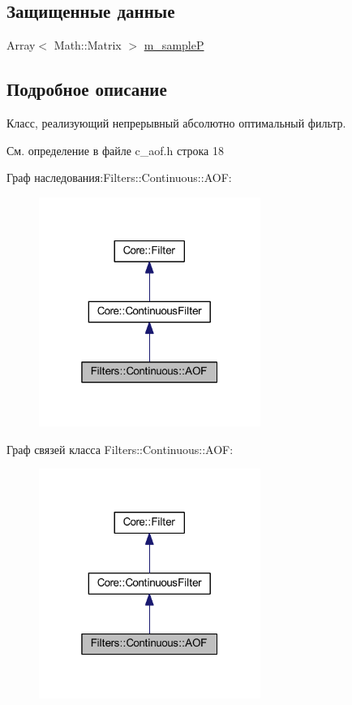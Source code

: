 \subsection*{Защищенные данные}
\begin{DoxyCompactItemize}
\item 
Array$<$ Math\+::\+Matrix $>$ \hyperlink{class_filters_1_1_continuous_1_1_a_o_f_a3cff90f7e12e677f04102f1717ef7a49}{m\+\_\+sampleP}
\end{DoxyCompactItemize}


\subsection{Подробное описание}
Класс, реализующий непрерывный абсолютно оптимальный фильтр. 

См. определение в файле c\+\_\+aof.\+h строка 18



Граф наследования\+:Filters\+:\+:Continuous\+:\+:A\+OF\+:
\nopagebreak
\begin{figure}[H]
\begin{center}
\leavevmode
\includegraphics[width=205pt]{class_filters_1_1_continuous_1_1_a_o_f__inherit__graph}
\end{center}
\end{figure}


Граф связей класса Filters\+:\+:Continuous\+:\+:A\+OF\+:
\nopagebreak
\begin{figure}[H]
\begin{center}
\leavevmode
\includegraphics[width=205pt]{class_filters_1_1_continuous_1_1_a_o_f__coll__graph}
\end{center}
\end{figure}


